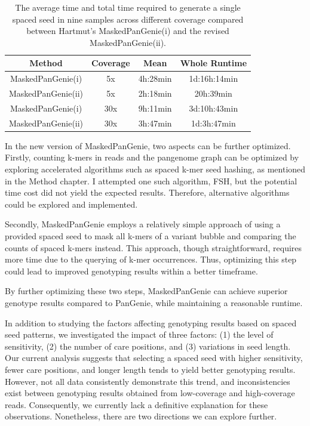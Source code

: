 \documentclass{PHlab-thesis}
\begin{document}
\begin{table}[h!]
	\centering
	\begin{tabular*}{\textwidth}{@{\extracolsep{\fill}}cccc@{\extracolsep{\fill}}}
        \toprule
        Method & Coverage & Mean & Whole Runtime\\
        \midrule
        MaskedPanGenie(i)& 5x & 4h:28min & 1d:16h:14min\\
        MaskedPanGenie(ii)& 5x & 2h:18min & 20h:39min\\
        \midrule
        MaskedPanGenie(i)& 30x & 9h:11min & 3d:10h:43min\\
        MaskedPanGenie(ii)& 30x & 3h:47min & 1d:3h:47min\\
        \bottomrule 
	\end{tabular*}
	\caption{The average time and total time required to generate a single spaced seed in nine samples across different coverage compared between Hartmut's MaskedPanGenie(i) and the revised MaskedPanGenie(ii).}
	\label{table:RuntimeSpaced}
\end{table}

In the new version of MaskedPanGenie, two aspects can be further optimized. Firstly, counting k-mers in reads and the pangenome graph can be optimized by exploring accelerated algorithms such as spaced k-mer seed hashing, as mentioned in the Method chapter. I attempted one such algorithm, FSH, but the potential time cost did not yield the expected results. Therefore, alternative algorithms could be explored and implemented.

Secondly, MaskedPanGenie employs a relatively simple approach of using a provided spaced seed to mask all k-mers of a variant bubble and comparing the counts of spaced k-mers instead. This approach, though straightforward, requires more time due to the querying of k-mer occurrences. Thus, optimizing this step could lead to improved genotyping results within a better timeframe.

By further optimizing these two steps, MaskedPanGenie can achieve superior genotype results compared to PanGenie, while maintaining a reasonable runtime.

In addition to studying the factors affecting genotyping results based on spaced seed patterns, we investigated the impact of three factors: (1) the level of sensitivity, (2) the number of care positions, and (3) variations in seed length. Our current analysis suggests that selecting a spaced seed with higher sensitivity, fewer care positions, and longer length tends to yield better genotyping results. However, not all data consistently demonstrate this trend, and inconsistencies exist between genotyping results obtained from low-coverage and high-coverage reads. Consequently, we currently lack a definitive explanation for these observations. Nonetheless, there are two directions we can explore further.
\end{document}
